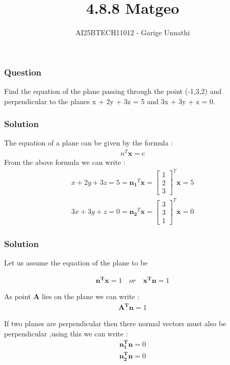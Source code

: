 \documentclass{beamer}
\title{4.8.8 Matgeo}
\author{AI25BTECH11012 - Garige Unnathi}
\date{}
\begin{document}
\frame{\titlepage}

\begin{frame}
\frametitle{Question}
Find the equation of the plane passing through the point (-1,3,2) and perpendicular
to the planes x + 2y + 3z = 5 and 3x + 3y + z = 0. 
\end{frame}


\begin{frame}
\frametitle{Solution}
The equation of a plane can be given by the formula :
\begin{align}
    n^{T}\textbf{x} = c
\end{align}
From the above formula we can write :
\begin{align}
x + 2y + 3z = 5  = \mathbf{n_1}^{T}\textbf{x} = \begin{bmatrix}1\\2\\3\end{bmatrix}^{T}\textbf{x} = 5\\
3x + 3y + z = 0  = \mathbf{n_2}^{T}\textbf{x} = \begin{bmatrix}3\\3\\1\end{bmatrix}^{T}\textbf{x} = 0
\end{align}

\end{frame}



\begin{frame}
\frametitle{Solution}
Let us assume the equation of the plane to be

\begin{align}
      \mathbf{n^{T}}\textbf{x} = 1 \quad or \quad 
      \mathbf{x^{T}}\textbf{n} = 1
\end{align}

As point \textbf{A} lies on the plane we can write :
\begin{align}
    \mathbf{A^{T}}\textbf{n} = 1
\end{align}

If two planes are perpendicular then there normal vectors must also be perpendicular ,using this we can write :
\begin{align}
    \mathbf{n_1^{T}}\textbf{n} = 0\\
    \mathbf{n_2^{T}}\textbf{n} = 0
\end{align}
\end{frame}
\end{document}
